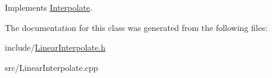 \-Implements \hyperlink{classInterpolate_af899b3717d017a8e2054e411f5f780a9}{\-Interpolate}.



\-The documentation for this class was generated from the following files\-:\begin{DoxyCompactItemize}
\item 
include/\hyperlink{LinearInterpolate_8h}{\-Linear\-Interpolate.\-h}\item 
src/\-Linear\-Interpolate.\-cpp\end{DoxyCompactItemize}
